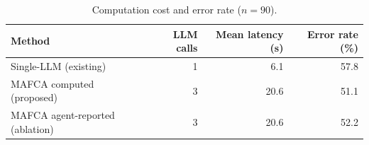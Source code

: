 \begin{table}[H]
\centering
\caption{Computation cost and error rate ($n = 90$).}
\label{tab:cost}
\small
\begin{tabular}{@{}lrrr@{}}
\toprule
Method & LLM calls & Mean latency (s) & Error rate (\%) \\
\midrule
Single-LLM (existing) & 1 & 6.1 & 57.8 \\
MAFCA computed (proposed) & 3 & 20.6 & 51.1 \\
MAFCA agent-reported (ablation) & 3 & 20.6 & 52.2 \\
\bottomrule
\end{tabular}
\end{table}
